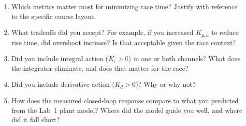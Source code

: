 \documentclass[../../book.tex]{subfiles}
\begin{document}
\begin{enumerate}
  \item Which metrics matter most for minimizing race time?  Justify with reference to the specific course layout.
  \item What tradeoffs did you accept?  For example, if you increased $K_{p,u}$ to reduce rise time, did overshoot increase?  Is that acceptable given the race context?
  \item Did you include integral action ($K_i > 0$) in one or both channels?  What does the integrator eliminate, and does that matter for the race?
  \item Did you include derivative action ($K_d > 0$)?  Why or why not?
  \item How does the measured closed-loop response compare to what you predicted from the Lab~1 plant model?  Where did the model guide you well, and where did it fall short?
\end{enumerate}
\end{document}
